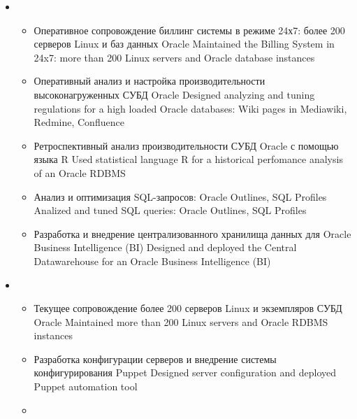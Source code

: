 \documentclass[11pt,a4paper,sans]{moderncv}        %
\begin{document}
{\begin{itemize}
\begin{itemize}
			\item {}
				{Разработка регламентов обеспечения отказоустойчивости систем биллинга: Oracle STANDBY database, Oracle DataGuard, Oracle GoldenGate}
				{Designed a fault tolerance strategy for the Billing System: Oracle standby, Oracle DataGuard, Oracle GoldenGate}
		\end{itemize}
	\item {}
		\begin{itemize}
			\item {}
				{Оперативное сопровождение биллинг системы в режиме 24х7: более 200 серверов Linux и баз данных Oracle}
				{Maintained the Billing System in 24x7: more than 200 Linux servers and Oracle database instances}
			\item {}
				{Оперативный анализ и настройка производительности высоконагруженных СУБД Oracle}
				{Designed analyzing and tuning regulations for a high loaded Oracle databases: Wiki pages in Mediawiki, Redmine, Confluence}
			\item {}
				{Ретроспективный анализ производительности СУБД Oracle с помощью языка R}
				{Used statistical language R for a historical perfomance analysis of an Oracle RDBMS}
			\item {}
				{Анализ и оптимизация SQL-запросов: Oracle Outlines, SQL Profiles}
				{Analized and tuned SQL queries: Oracle Outlines, SQL Profiles}
			\item {}
				{Разработка и внедрение централизованного хранилища данных для Oracle Business Intelligence (BI)}
				{Designed and deployed the Central Datawarehouse for an Oracle Business Intelligence (BI)}
		\end{itemize}
	\item {}
		\begin{itemize}
			\item {}
				{Текущее сопровождение более 200 серверов Linux и экземпляров СУБД Oracle}
				{Maintained more than 200 Linux servers and Oracle RDBMS instances}
			\item {}
				{Разработка конфигурации серверов и внедрение системы конфигурирования Puppet}
				{Designed server configuration and deployed Puppet automation tool}
			\item {}

\end{itemize}
\end{itemize}}
\end{document}
